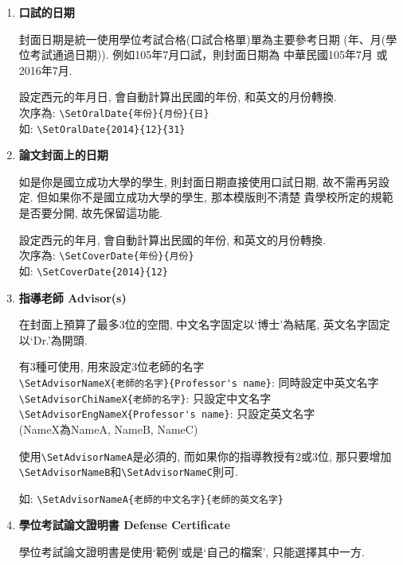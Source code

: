 \begin{enumerate}
  \item
  {
    \textbf{口試的日期}

    封面日期是統一使用學位考試合格(口試合格單)單為主要參考日期 (年、月(學位考試通過日期)). 例如105年7月口試，則封面日期為 中華民國105年7月 或 2016年7月.

    設定西元的年月日, 會自動計算出民國的年份, 和英文的月份轉換.\\
    次序為: \verb|\SetOralDate{年份}{月份}{日}|\\
    如: \verb|\SetOralDate{2014}{12}{31}|
  } %

  \item
  {
    \textbf{論文封面上的日期}

    如是你是國立成功大學的學生, 則封面日期直接使用口試日期, 故不需再另設定. 但如果你不是國立成功大學的學生, 那本模版則不清楚 貴學校所定的規範是否要分開, 故先保留這功能.

    設定西元的年月, 會自動計算出民國的年份, 和英文的月份轉換.\\
    次序為: \verb|\SetCoverDate{年份}{月份}|\\
    如: \verb|\SetCoverDate{2014}{12}|
  } %

  \item
  {
    \textbf{指導老師 Advisor(s)}

    在封面上預算了最多3位的空間, 中文名字固定以`博士'為結尾, 英文名字固定以`Dr.'為開頭.

    有3種可使用, 用來設定3位老師的名字\\
    \verb|\SetAdvisorNameX{老師的名字}{Professor's name}|: 同時設定中英文名字\\
    \verb|\SetAdvisorChiNameX{老師的名字}|: 只設定中文名字\\
    \verb|\SetAdvisorEngNameX{Professor's name}|: 只設定英文名字\\
    (NameX為NameA, NameB, NameC)

    使用\verb|\SetAdvisorNameA|是必須的, 而如果你的指導教授有2或3位, 那只要增加\verb|\SetAdvisorNameB|和\verb|\SetAdvisorNameC|則可.

    如: \verb|\SetAdvisorNameA{老師的中文名字}{老師的英文名字}|
  } %

  \item
  {
    \textbf{學位考試論文證明書 Defense Certificate}

    學位考試論文證明書是使用`範例'或是`自己的檔案', 只能選擇其中一方.

}
\end{enumerate}
